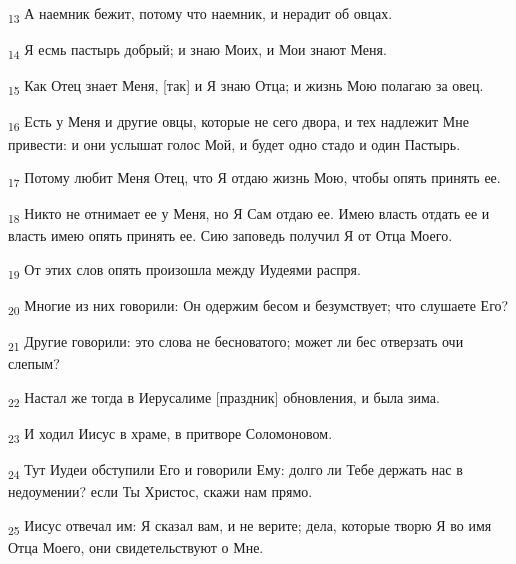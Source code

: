 \begin{tcolorbox}
\textsubscript{13} А наемник бежит, потому что наемник, и нерадит об овцах.
\end{tcolorbox}
\begin{tcolorbox}
\textsubscript{14} Я есмь пастырь добрый; и знаю Моих, и Мои знают Меня.
\end{tcolorbox}
\begin{tcolorbox}
\textsubscript{15} Как Отец знает Меня, [так] и Я знаю Отца; и жизнь Мою полагаю за овец.
\end{tcolorbox}
\begin{tcolorbox}
\textsubscript{16} Есть у Меня и другие овцы, которые не сего двора, и тех надлежит Мне привести: и они услышат голос Мой, и будет одно стадо и один Пастырь.
\end{tcolorbox}
\begin{tcolorbox}
\textsubscript{17} Потому любит Меня Отец, что Я отдаю жизнь Мою, чтобы опять принять ее.
\end{tcolorbox}
\begin{tcolorbox}
\textsubscript{18} Никто не отнимает ее у Меня, но Я Сам отдаю ее. Имею власть отдать ее и власть имею опять принять ее. Сию заповедь получил Я от Отца Моего.
\end{tcolorbox}
\begin{tcolorbox}
\textsubscript{19} От этих слов опять произошла между Иудеями распря.
\end{tcolorbox}
\begin{tcolorbox}
\textsubscript{20} Многие из них говорили: Он одержим бесом и безумствует; что слушаете Его?
\end{tcolorbox}
\begin{tcolorbox}
\textsubscript{21} Другие говорили: это слова не бесноватого; может ли бес отверзать очи слепым?
\end{tcolorbox}
\begin{tcolorbox}
\textsubscript{22} Настал же тогда в Иерусалиме [праздник] обновления, и была зима.
\end{tcolorbox}
\begin{tcolorbox}
\textsubscript{23} И ходил Иисус в храме, в притворе Соломоновом.
\end{tcolorbox}
\begin{tcolorbox}
\textsubscript{24} Тут Иудеи обступили Его и говорили Ему: долго ли Тебе держать нас в недоумении? если Ты Христос, скажи нам прямо.
\end{tcolorbox}
\begin{tcolorbox}
\textsubscript{25} Иисус отвечал им: Я сказал вам, и не верите; дела, которые творю Я во имя Отца Моего, они свидетельствуют о Мне.
\end{tcolorbox}
